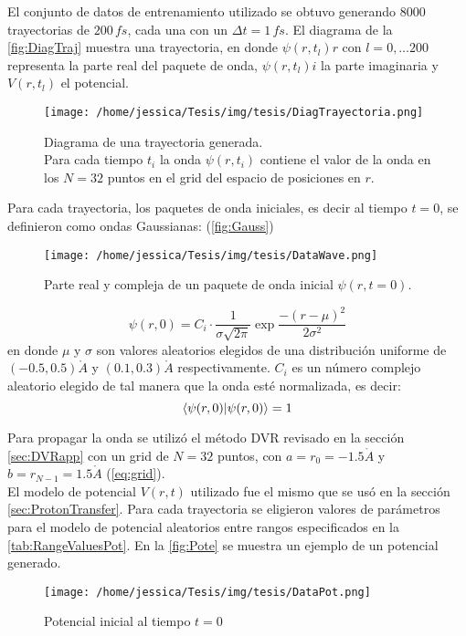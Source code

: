 El conjunto de datos de entrenamiento utilizado se obtuvo generando 8000 trayectorias de $200\,fs$, cada una con un $\Delta t = 1\,fs$. El diagrama de la \autoref{fig:DiagTraj} muestra una trayectoria, en donde $\psi(r,t_l)r$ con $l=0,\dots 200$ representa la parte real del paquete de onda, $\psi(r,t_l)i$ la parte imaginaria y $V(r,t_l)$ el potencial.

\begin{figure}[H]
  \centering
  \texttt{[image: /home/jessica/Tesis/img/tesis/DiagTrayectoria.png]}
  \caption{Diagrama de una trayectoria generada.\\Para cada tiempo $t_i$ la onda $\psi(r,t_i)$ contiene el valor de la onda en los $N=32$ puntos en el grid del espacio de posiciones en $r$.}
  \label{fig:DiagTraj}
\end{figure}

Para cada trayectoria, los paquetes de onda iniciales, es decir al tiempo $t=0$, se definieron como ondas Gaussianas: (\autoref{fig:Gauss})
\begin{figure}[H]
  \centering
  \texttt{[image: /home/jessica/Tesis/img/tesis/DataWave.png]}
  \caption{Parte real y compleja de un paquete de onda inicial $\psi(r,t=0)$.}
  \label{fig:Gauss}
\end{figure}

\begin{equation}
  \label{eq:gaussian}
  \psi(r,0) = C_i\cdot \frac{1}{\sigma\sqrt{2\pi}}\exp{\frac{-(r-\mu)^2}{2\sigma^2}}
\end{equation}
en donde $\mu$ y $\sigma$ son valores aleatorios elegidos de una distribución uniforme de $(-0.5,0.5)\mathring{A}$ y $(0.1,0.3)\mathring{A}$ respectivamente. $C_i$ es un número complejo aleatorio elegido de tal manera que la onda esté normalizada, es decir:
$$\bra{\psi(r,0)}\ket{\psi(r,0)} = 1$$

Para propagar la onda se utilizó el método \acs{DVR} revisado en la sección \autoref{sec:DVRapp} con un grid de $N=32$ puntos, con $a=r_0=-1.5\mathring{A}$ y $b=r_{N-1}=1.5\mathring{A}$ (\autoref{eq:grid}).
\\
El modelo de potencial $V(r,t)$ utilizado fue el mismo que se usó en la sección \autoref{sec:ProtonTransfer}. Para cada trayectoria se eligieron valores de parámetros para el modelo de potencial aleatorios entre rangos especificados en la \autoref{tab:RangeValuesPot}. En la \autoref{fig:Pote} se muestra un ejemplo de un potencial generado.
\begin{figure}[H]
  \centering
  \texttt{[image: /home/jessica/Tesis/img/tesis/DataPot.png]}
  \caption{Potencial inicial al tiempo $t=0$}
  \label{fig:Pote}
\end{figure}

